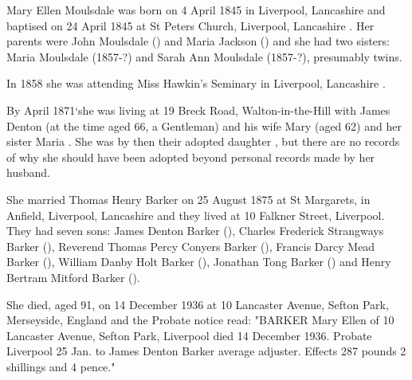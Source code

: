 
Mary Ellen Moulsdale was born on 4 April 1845 in Liverpool, Lancashire \cite{MEMoulsdaleBirth} and baptised on 24 April 1845 at St Peters Church, Liverpool, Lancashire \cite{MEMoulsdaleBaptism}. Her parents were John Moulsdale () and Maria Jackson () and she had two sisters: Maria Moulsdale (1857-?) and Sarah Ann Moulsdale (1857-?), presumably twins. 

In 1858 she was attending Miss Hawkin's Seminary in Liverpool, Lancashire \cite{MEMoulsdaleSchool}. 
  
By April 1871`she was living at 19 Breck Road, Walton-in-the-Hill with James Denton (at the time aged 66, a Gentleman) and his wife Mary (aged 62) and her sister Maria \cite{MEMoulsdaleResidence}.  She was by then their adopted daughter \cite{MEMoulsdaleAdoption},  but there are no records of why she should have been adopted beyond personal records made by her husband. 

She married Thomas Henry Barker on 25 August 1875 at St Margarets, in Anfield, Liverpool, Lancashire \cite{MEMoulsdaleMarriage} and they lived at 10 Falkner Street, Liverpool.  They had seven sons: James Denton Barker (), Charles Frederick Strangways Barker (), Reverend Thomas Percy Conyers Barker (), Francis Darcy Mead Barker (), William Danby Holt Barker (), Jonathan Tong Barker () and Henry Bertram Mitford Barker ().

She died, aged 91, on 14 December 1936 at 10 Lancaster Avenue, Sefton Park, Merseyside, England \cite{ToxtethBarker20} and the Probate notice read:
"BARKER Mary Ellen of 10 Lancaster Avenue, Sefton Park, Liverpool died 14 December 1936. Probate Liverpool 25 Jan. to James Denton Barker average adjuster. Effects 287 pounds 2 shillings and 4 pence." 

